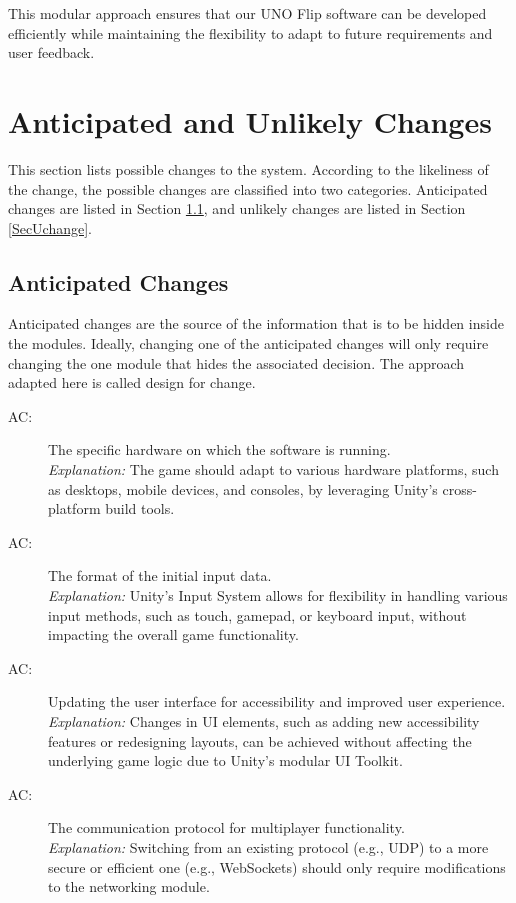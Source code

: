 \documentclass[12pt, titlepage]{article}
\newcounter{acnum}
\newcommand{\actheacnum}{AC\theacnum}
\begin{document}
This modular approach ensures that our UNO Flip software can be developed efficiently while maintaining the flexibility to adapt to future requirements and user feedback.


\section{Anticipated and Unlikely Changes} \label{SecChange}

This section lists possible changes to the system. According to the likeliness
of the change, the possible changes are classified into two
categories. Anticipated changes are listed in Section \ref{SecAchange}, and
unlikely changes are listed in Section \ref{SecUchange}.

\subsection{Anticipated Changes} \label{SecAchange}

Anticipated changes are the source of the information that is to be hidden
inside the modules. Ideally, changing one of the anticipated changes will only
require changing the one module that hides the associated decision. The approach
adapted here is called design for
change.

\begin{description}
\item[ \actheacnum \label{acHardware}:] The specific
  hardware on which the software is running. \\
  \textit{Explanation:} The game should adapt to various hardware platforms, such as desktops, mobile devices, and consoles, by leveraging Unity's cross-platform build tools.
  
\item[ \actheacnum \label{acInput}:] The format of the
  initial input data. \\
  \textit{Explanation:} Unity's Input System allows for flexibility in handling various input methods, such as touch, gamepad, or keyboard input, without impacting the overall game functionality.
  
\item[ \actheacnum \label{acUI}:] Updating the user interface for accessibility and improved user experience. \\
  \textit{Explanation:} Changes in UI elements, such as adding new accessibility features or redesigning layouts, can be achieved without affecting the underlying game logic due to Unity's modular UI Toolkit.

\item[ \actheacnum \label{acNetwork}:] The communication protocol for multiplayer functionality. \\
  \textit{Explanation:} Switching from an existing protocol (e.g., UDP) to a more secure or efficient one (e.g., WebSockets) should only require modifications to the networking module.
\end{description}
\end{document}
